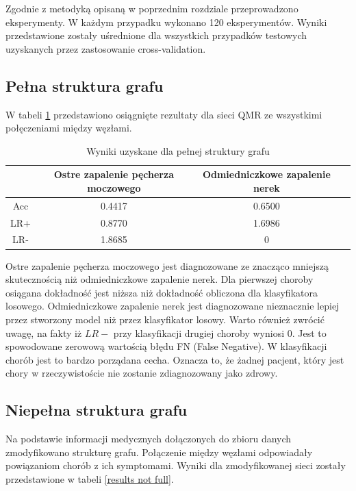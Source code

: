 \documentclass{article}
\begin{document}
Zgodnie z metodyką opisaną w poprzednim rozdziale przeprowadzono eksperymenty. W każdym przypadku wykonano 120 eksperymentów. Wyniki przedstawione zostały uśrednione dla wszystkich przypadków testowych uzyskanych przez zastosowanie cross-validation. 

\subsection{Pełna struktura grafu}

W tabeli \ref{results full} przedstawiono osiągnięte rezultaty dla sieci QMR ze wszystkimi połęczeniami między węzłami.

\begin{table}[H]
\caption{Wyniki uzyskane dla pełnej struktury grafu}
\label{results full}
\centering
\begin{tabular}{|c|c|c|c|}
  \hline 
   & Ostre zapalenie pęcherza moczowego & Odmiedniczkowe zapalenie nerek \\
  \hline
  Acc & 0.4417 & 0.6500 \\
  \hline
  LR+ & 0.8770 & 1.6986 \\
  \hline
  LR- & 1.8685 & 0 \\
  \hline
\end{tabular}
\end{table}

Ostre zapalenie pęcherza moczowego jest diagnozowane ze znacząco mniejszą skutecznością niż odmiedniczkowe zapalenie nerek. Dla pierwszej choroby osiągana dokładność jest niższa niż dokładność obliczona dla klasyfikatora losowego. Odmiedniczkowe zapalenie nerek jest diagnozowane nieznacznie lepiej przez stworzony model niż przez klasyfikator losowy. Warto również zwrócić uwagę, na fakty iż $LR-$ przy klasyfikacji drugiej choroby wyniosi 0. Jest to spowodowane zerowową wartością błędu FN (False Negative). W klasyfikacji chorób jest to bardzo porządana cecha. Oznacza to, że żadnej pacjent, który jest chory w rzeczywistoście nie zostanie zdiagnozowany jako zdrowy.

\subsection{Niepełna struktura grafu}

Na podstawie informacji medycznych dołączonych do zbioru danych zmodyfikowano strukturę grafu. Połączenie między węzłami odpowiadały powiązaniom chorób z ich symptomami. Wyniki dla zmodyfikowanej sieci zostały przedstawione w tabeli \ref{results not full}.
\end{document}
